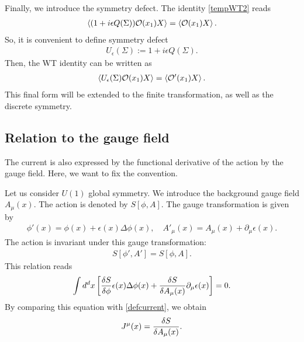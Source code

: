 \documentclass[12pt]{scrartcl}
\newcommand{\del}{\partial}
\newcommand{\Ocal}{\mathcal{O}}
\begin{document}
Finally, we introduce the symmetry defect.  The identity \eqref{tempWT2} reads
\begin{align}
    \expval{(1+i\epsilon Q(\Sigma))\Ocal(x_1)X}=\expval{\Ocal(x_1)X}.
\end{align}
So, it is convenient to define symmetry defect
\begin{align}
    U_{\epsilon}(\Sigma):=
    1+i\epsilon Q(\Sigma).
\end{align}
Then, the WT identity can be written as
\begin{align}
    \expval{U_{\epsilon}(\Sigma)\Ocal(x_1) X}=\expval{\Ocal'(x_1)X}.
\end{align}
This final form will be extended to the finite transformation, as well as the discrete symmetry.

\subsection{Relation to the gauge field}

The current is also expressed by the functional derivative of the action by the gauge field.  Here, we want to fix the convention.

Let us consider $U(1)$ global symmetry.   We introduce the background gauge field $A_{\mu}(x)$.  The action is denoted by $S[\phi,A]$.
The gauge transformation is given by
\begin{align}
    \phi'(x)=\phi(x)+\epsilon(x)\Delta \phi(x),\quad
    A'_{\mu}(x)=A_{\mu}(x)+\del_{\mu}\epsilon(x).
\end{align}
The action is invariant under this gauge transformation:
\begin{align}
    S[\phi',A']=S[\phi,A].
\end{align}
This relation reads
\begin{align}
    \int d^dx\left[
        \fdv{S}{\phi}\epsilon(x)\Delta \phi(x)
        +\fdv{S}{A_{\mu}(x)}\del_{\mu}\epsilon(x)
    \right]=0.
\end{align}
By comparing this equation with \eqref{defcurrent}, we obtain
\begin{align}
    J^{\mu}(x)=\fdv{S}{A_{\mu}(x)}.
\end{align}
\end{document}
